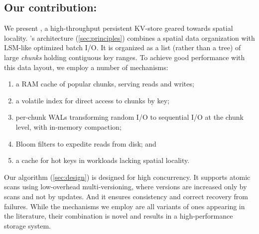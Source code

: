 \subsection{Our contribution: \sys}

We present \sys, a high-throughput persistent KV-store geared towards spatial locality. 
\sys's  architecture (\cref{sec:principles}) 
combines a spatial data organization with LSM-like optimized batch I/O.
It is organized  as a list (rather than a tree) of large \emph{chunks} holding contiguous key ranges.
%
To achieve good performance with this data layout, we employ a number of mechanisms: 

\begin{enumerate} 
     \setlength{\itemindent}{-10pt}
\item
 a RAM cache of popular chunks, serving  reads and writes;  
\item
 a volatile index for direct access to chunks by key; 
\item
 per-chunk WALs  transforming random I/O to sequential I/O at the chunk level, with in-memory compaction; 
\item
Bloom filters to expedite reads from disk; and 
\item 
a   cache for hot keys in workloads lacking spatial locality.
\end{enumerate}

Our algorithm (\cref{sec:design}) is designed for high %
concurrency. 
It supports atomic scans using low-overhead multi-versioning, where versions are increased only by scans and not by updates. And it ensures consistency and correct recovery from failures. While the mechanisms we employ are all variants of ones appearing in the literature, their combination is novel and results in a high-performance storage system.





